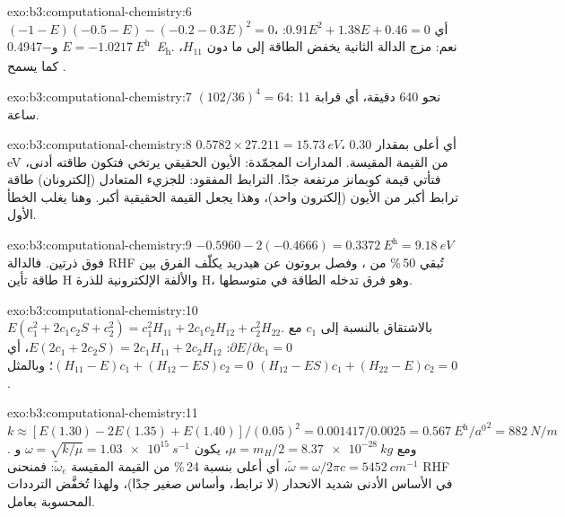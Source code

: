 \begin{solution}{exo:b3:computational-chemistry:6}
$(-1 - E)(-0.5 - E) - (-0.2 - 0.3E)^2 = 0$، أي $0.91E^2 + 1.38E + 0.46 = 0$:
$E = \qty{-1.0217}{\hartree}$ و\qty{-0.4947}{\hartree}. نعم: مزج الدالة
الثانية يخفض الطاقة إلى ما دون $H_{11}$، كما يسمح .
\end{solution}

\begin{solution}{exo:b3:computational-chemistry:7}
$(102/36)^4 = 64$: نحو 640 دقيقة، أي قرابة 11 ساعة.
\end{solution}

\begin{solution}{exo:b3:computational-chemistry:8}
$0.5782 \times 27.211 = \qty{15.73}{eV}$، أي أعلى بمقدار 0.30 eV من القيمة المقيسة. المدارات
المجمّدة: الأيون الحقيقي يرتخي فتكون طاقته أدنى، فتأتي قيمة كوبمانز مرتفعة جدًا.
الترابط المفقود: للجزيء المتعادل (إلكترونان) طاقة ترابط
أكبر من الأيون (إلكترون واحد)، وهذا يجعل القيمة الحقيقية أكبر.
وهنا يغلب الخطأ الأول.
\end{solution}

\begin{solution}{exo:b3:computational-chemistry:9}
$-0.5960 - 2(-0.4666) = \qty{0.3372}{\hartree} = \qty{9.18}{eV}$ فوق ذرتين.
فالدالة RHF تُبقي 50\,\% من ، وفصل بروتون عن
هيدريد يكلّف الفرق بين طاقة تأين H 
والألفة الإلكترونية للذرة H، وهو فرق تدخله الطاقة في متوسطها.
\end{solution}

\begin{solution}{exo:b3:computational-chemistry:10}
$E(c_1^2 + 2c_1c_2S + c_2^2) = c_1^2H_{11} + 2c_1c_2H_{12} + c_2^2H_{22}$.
بالاشتقاق بالنسبة إلى $c_1$ مع $\partial E/\partial c_1 = 0$:
$E(2c_1 + 2c_2S) = 2c_1H_{11} + 2c_2H_{12}$، أي $(H_{11} - E)c_1 + (H_{12} -
ES)c_2 = 0$؛ وبالمثل $(H_{12} - ES)c_1 + (H_{22} - E)c_2 = 0$.
\end{solution}

\begin{solution}{exo:b3:computational-chemistry:11}
$k \approx [E(1.30) - 2E(1.35) + E(1.40)]/(0.05)^2 = 0.001417/0.0025 =
\qty{0.567}{\hartree\per\bohr\squared} = \qty{882}{N/m}$. ومع $\mu = m_H/2 =
\qty{8.37e-28}{kg}$، يكون $\omega = \sqrt{k/\mu} = \qty{1.03e15}{s^{-1}}$ 
و$\tilde\omega = \omega/2\pi c = \qty{5452}{cm^{-1}}$، أي أعلى بنسبة 24\,\% من القيمة المقيسة
$\tilde\omega_e$: فمنحنى RHF في الأساس الأدنى شديد الانحدار (لا ترابط، وأساس
صغير جدًا)، ولهذا تُخفَّض الترددات المحسوبة بعامل.
\end{solution}

